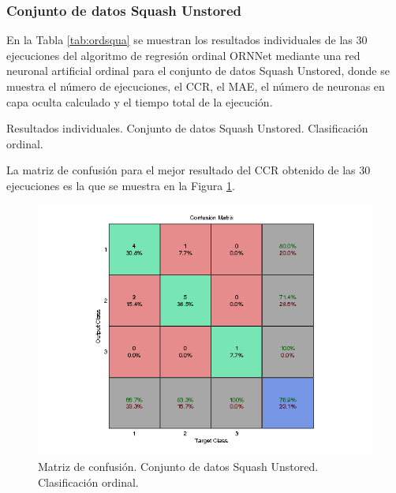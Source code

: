 			\subsubsection{Conjunto de datos Squash Unstored}
			
			En la Tabla \ref{tab:ordsqua} se muestran los resultados individuales de las 30 ejecuciones del algoritmo de regresión ordinal ORNNet mediante una red neuronal artificial ordinal para el conjunto de datos Squash Unstored, donde se muestra el número de ejecuciones, el CCR, el MAE, el número de neuronas en capa oculta calculado y el tiempo total de la ejecución.\\
			
			\begin{table}[!htbp]
				\centering
				\caption{Resultados individuales. Conjunto de datos Squash Unstored. Clasificación ordinal.}
				\label{tab:ordsqua}
			\end{table}
			
			La matriz de confusión para el mejor resultado del CCR obtenido de las 30 ejecuciones es la que se muestra en la Figura \ref{fig:ordsqua}.
			
			\begin{figure}[htbp]
				\centering
				\includegraphics[scale=0.8]{../src/results/ordinal/squash-unstored_mc1.png}
				\caption{Matriz de confusión. Conjunto de datos Squash Unstored. Clasificación ordinal.}
				\label{fig:ordsqua}
			\end{figure}
			
